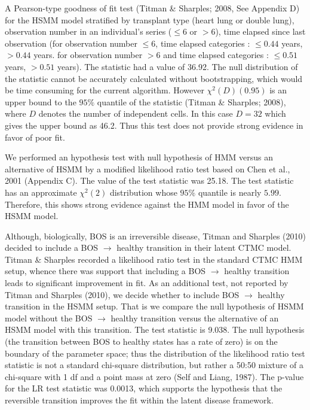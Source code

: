 \documentclass{uwstat572}
\begin{document}
A Pearson-type goodness of fit test (Titman \& Sharples; 2008, See Appendix D) for the HSMM  model stratified by transplant type (heart lung or double lung), observation number in an individual’s series ($\leq 6$ or $>6$), time elapsed since last observation (for observation number $\leq 6$, time elapsed categories : $\leq 0.44$ years, $> 0.44$ years. for observation number $> 6$ and time elapsed categories : $\leq 0.51$ years, $> 0.51$ years). The statistic had a value of 36.92. The null distribution of the statistic cannot be accurately calculated without bootstrapping, which would be time consuming for the current algorithm. However $\chi^2(D) (0.95)$ is an upper bound to the $95\%$ quantile of the statistic (Titman \& Sharples; 2008), where $D$ denotes the number of independent cells. In this case $D = 32$ which gives the upper bound as 46.2. Thus this test does not provide strong evidence in favor of poor fit.

We performed an hypothesis test with null hypothesis of HMM versus an alternative of HSMM by a modified likelihood ratio test based on Chen et al., 2001 (Appendix C). The value of the test statistic was 25.18. The test statistic has an approximate $\chi^2(2)$ distribution whose $95\%$ quantile is nearly $5.99$. Therefore, this shows strong evidence against the HMM model in favor of the HSMM model.

Although, biologically, BOS is an irreversible disease, Titman and Sharples (2010) decided to include a BOS $\rightarrow$ healthy transition in their latent CTMC model. Titman \& Sharples recorded a likelihood ratio test in the standard CTMC HMM setup, whence there was support that including a BOS $\rightarrow$ healthy transition leads to significant improvement in fit. As an additional test, not reported by Titman and Sharples (2010), we decide whether to include BOS $\rightarrow$ healthy transition in the HSMM setup. That is we compare the null hypothesis of HSMM model without the BOS $\rightarrow$ healthy transition versus the alternative of an HSMM model with this transition. The test statistic is 9.038. The null hypothesis (the transition between BOS to healthy states has a rate of zero) is on the boundary of the parameter space; thus the distribution of the likelihood ratio test statistic is not a standard chi-square distribution, but rather a 50:50 mixture of a chi-square with 1 df and a point mass at zero (Self and Liang, 1987). The p-value for the LR test statistic was 0.0013, which supports the hypothesis that the reversible transition improves the fit within the latent disease framework.
\end{document}
